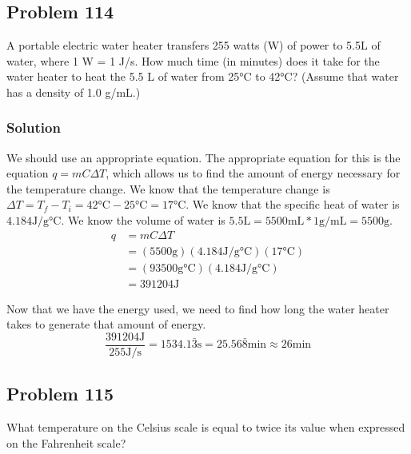 \documentclass[11pt]{report}
\begin{document}
\pagebreak

\chapter{}
\section{Problem 114}
A portable electric water heater transfers 255 watts (W) of power to 5.5L of water, where 1 W = 1 J/s. How much time (in minutes) does it take for the water heater to heat the 5.5 L of water from 25\unit{\celsius} to 42\unit{\celsius}? (Assume that water has a density of 1.0 \unit{\gram/\milli\liter}.) 

\subsection{Solution}
We should use an appropriate equation. 
The appropriate equation for this is the equation $q = mC\Delta T$, which allows us to find the amount of energy necessary for the temperature change.
We know that the temperature change is $\Delta T = T_f - T_i = 42\unit{\celsius} - 25\unit{\celsius} = 17\unit{\celsius}$.
We know that the specific heat of water is $4.184\unit{\joule/\gram\celsius}$.
We know the volume of water is $5.5\unit{\liter} = 5500\unit{\milli\liter} * 1\unit{\gram/\milli\liter} = 5500\unit{\gram}$.
\begin{align*}
    q   &=  mC\Delta T\\
        &=  (5500\unit{\gram})(4.184\unit{\joule/\gram\celsius})(17\unit{\celsius})\\
        &=  (93500\unit{\gram\celsius})(4.184\unit{\joule/\gram\celsius})\\
        &=  391204\unit{\joule}
\end{align*}

Now that we have the energy used, we need to find how long the water heater takes to generate that amount of energy.
\begin{equation*}
    \frac{391204\unit{\joule}}{255\unit{\joule/\second}} = 1534.1\bar{3}\unit{\second} = 25.56\bar{8}\unit{\minute} \approx \boxed{26\unit{\minute}}
\end{equation*}


\section{Problem 115}
What temperature on the Celsius scale is equal to twice its value when expressed on the Fahrenheit scale?
\end{document}
